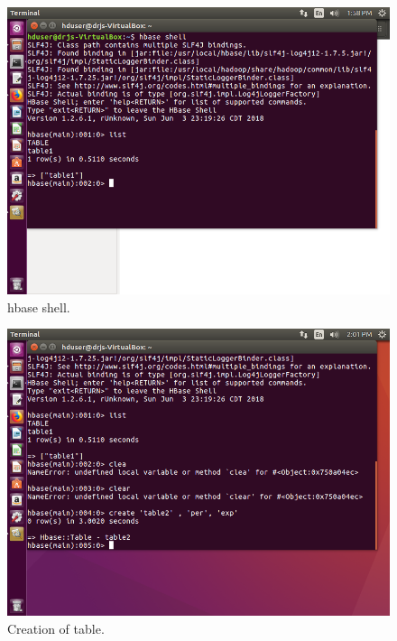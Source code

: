 \documentclass[a4paper,10pt]{article}
\begin{document}
\begin{figure}[h]
	\includegraphics[scale=0.33,center]{11.png}
	\caption{hbase shell.}
	\label{fig:13}
\end{figure}

\begin{figure}[h]
	\includegraphics[scale=0.33,center]{12.png}
	\caption{Creation of table.}
	\label{fig:14}
\end{figure}
\end{document}
